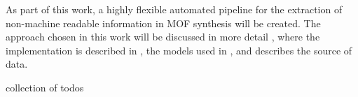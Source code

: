 As part of this work, a highly flexible automated pipeline for the extraction of non-machine readable information in \gls{MOF} synthesis will be created.
The approach chosen in this work will be discussed in more detail , where the implementation is described in , the models used in , and  describes the source of data.


\newpage
collection of todos
